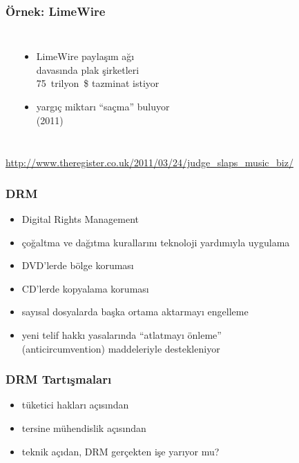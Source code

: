 \documentclass[dvipsnames]{beamer}
\theoremstyle{plain}
\begin{document}
\begin{frame}
  \frametitle{Örnek: LimeWire}

  \begin{columns}
    \begin{center}
    \end{center}

    \begin{itemize}
      \item LimeWire paylaşım ağı\\
        davasında plak şirketleri\\
        75~trilyon~\$ tazminat istiyor
      \item yargıç miktarı ``saçma'' buluyor\\
        (2011)
    \end{itemize}
  \end{columns}

  \medskip
  \tiny{\url{http://www.theregister.co.uk/2011/03/24/judge_slaps_music_biz/}}\\
\end{frame}

\begin{frame}
  \frametitle{DRM}

  \begin{itemize}
    \item Digital Rights Management
    \item çoğaltma ve dağıtma kurallarını teknoloji yardımıyla uygulama

    \medskip
    \item DVD'lerde bölge koruması
    \item CD'lerde kopyalama koruması
    \item sayısal dosyalarda başka ortama aktarmayı engelleme

    \pause
    \medskip
    \item yeni telif hakkı yasalarında ``atlatmayı önleme''\\
      (anticircumvention) maddeleriyle destekleniyor
  \end{itemize}
\end{frame}

\begin{frame}
  \frametitle{DRM Tartışmaları}

  \begin{itemize}
    \item tüketici hakları açısından
    \item tersine mühendislik açısından
    \item teknik açıdan, DRM gerçekten işe yarıyor mu?
  \end{itemize}
\end{frame}
\end{document}

